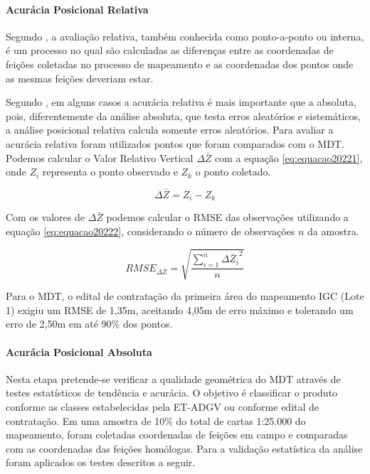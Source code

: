 \documentclass[12pt,a4paper]{article}
\begin{document}
		\paragraph{Acurácia Posicional Relativa}	
		
		Segundo , a avaliação relativa, também conhecida como ponto-a-ponto ou interna, é um processo no qual são calculadas as diferenças entre as coordenadas de feições coletadas no processo de mapeamento e as coordenadas dos pontos onde as mesmas feições deveriam	estar.
   
	    Segundo , em alguns casos a acurácia relativa é mais importante que a absoluta, pois, diferentemente da análise absoluta, que testa erros aleatórios e sistemáticos, a análise posicional relativa calcula somente erros aleatórios. Para avaliar a acurácia relativa foram utilizados pontos que foram comparados com o MDT. Podemos calcular o Valor Relativo Vertical $\Delta  \bar{Z}$ com a equação \ref{eq:equacao20221}, onde $Z_{i}$ representa o ponto observado e $Z_{k}$ o ponto coletado.
	    
		\begin{equation}
		\Delta  \bar{Z}=Z_{i}-Z_{k}
		\label{eq:equacao20221}
		\end{equation}
		
		Com os valores de $\Delta  \bar{Z}$ podemos calcular o RMSE das observações utilizando a equação \ref{eq:equacao20222}, considerando o número de observações $n$ da amostra.
		
		\begin{equation}
		RMSE_{\Delta\bar{Z}} =\sqrt {\frac{\sum\limits^{n}_{i=1}{\Delta\bar{Z}_{i}}^2}{n}}
		\label{eq:equacao20222}
		\end{equation}
		
		Para o MDT, o edital de contratação da primeira área do mapeamento IGC (Lote 1) exigiu um RMSE de 1,35m, aceitando 4,05m de erro máximo e tolerando um erro de 2,50m em até 90$\%$ dos pontos.
		
		\paragraph{Acurácia Posicional Absoluta}
		Nesta etapa pretende-se verificar a qualidade geométrica do MDT através de
		testes estatísticos de tendência e acurácia. O objetivo é classificar o produto conforme as classes estabelecidas pela ET-ADGV ou conforme edital de contratação. Em uma amostra de 10$\%$ do total de cartas 1:25.000 do mapeamento, foram coletadas coordenadas de feições em campo e comparadas com as coordenadas das feições homólogas. Para a validação estatística da análise foram aplicados os testes
		descritos a seguir.		
\end{document}

